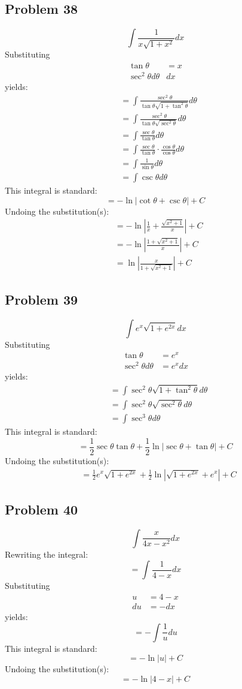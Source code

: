 \documentclass{article}
\begin{document}
\subsection*{Problem 38}
$$\int\frac{1}{x\sqrt{1+x^2}}dx$$
Substituting
\begin{align*}
\tan\theta&=x \\
\sec^2\theta d\theta&dx
\end{align*}
yields:
\begin{align*}
&=\int\frac{\sec^2\theta}{\tan\theta\sqrt{1+\tan^2\theta}}d\theta \\
&=\int\frac{\sec^2\theta}{\tan\theta\sqrt{\sec^2\theta}}d\theta \\
&=\int\frac{\sec\theta}{\tan\theta}d\theta \\
&=\int\frac{\sec\theta}{\tan\theta}\cdot\frac{\cos\theta}{\cos\theta}d\theta \\
&=\int\frac{1}{\sin\theta}d\theta \\
&=\int\csc\theta d\theta
\end{align*}
This integral is standard:
$$=-\ln\left|\cot\theta+\csc\theta\right|+C$$
Undoing the substitution(s):
\begin{align*}
&=-\ln\left|\frac{1}{x}+\frac{\sqrt{x^2+1}}{x}\right|+C \\
&=-\ln\left|\frac{1+\sqrt{x^2+1}}{x}\right|+C \\
&=\ln\left|\frac{x}{1+\sqrt{x^2+1}}\right|+C
\end{align*}
\subsection*{Problem 39}
$$\int e^x\sqrt{1+e^{2x}}dx$$
Substituting
\begin{align*}
\tan\theta&=e^x \\
\sec^2\theta d\theta&=e^xdx
\end{align*}
yields:
\begin{align*}
&=\int\sec^2\theta\sqrt{1+\tan^2\theta}d\theta \\
&=\int\sec^2\theta\sqrt{\sec^2\theta}d\theta \\
&=\int\sec^3\theta d\theta
\end{align*}
This integral is standard:
$$=\frac{1}{2}\sec\theta\tan\theta+\frac{1}{2}\ln\left|\sec\theta+\tan\theta\right|+C$$
Undoing the substitution(s):
\begin{align*}
&=\frac{1}{2}e^x\sqrt{1+e^{2x}}+\frac{1}{2}\ln\left|\sqrt{1+e^{2x}}+e^x\right|+C
\end{align*}
\subsection*{Problem 40}
$$\int\frac{x}{4x-x^2}dx$$
Rewriting the integral:
$$=\int\frac{1}{4-x}dx$$
Substituting
\begin{align*}
u&=4-x \\
du&=-dx
\end{align*}
yields:
$$=-\int\frac{1}{u}du$$
This integral is standard:
$$=-\ln\left|u\right|+C$$
Undoing the substitution(s):
$$=-\ln\left|4-x\right|+C$$
\end{document}
